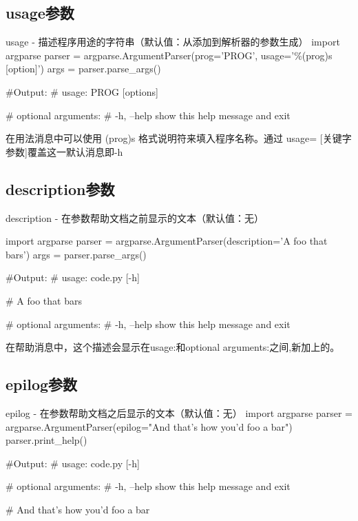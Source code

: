 \documentclass[11pt]{article}
\begin{document}
\subsection{usage参数} 	
 	\begin{Python}{usage - 描述程序用途的字符串（默认值：从添加到解析器的参数生成）}
import argparse
parser = argparse.ArgumentParser(prog='PROG', usage='\%(prog)s [option]')
args = parser.parse_args()
 		
#Output:   
#		 usage: PROG [options] 

#        optional arguments:
#          -h, --help  show this help message and exit
 	\end{Python}
 	在用法消息中可以使用 (prog)s 格式说明符来填入程序名称。通过 usage= [关键字参数]覆盖这一默认消息即-h
 
\subsection{description参数}	 
 	\begin{Python}{description - 在参数帮助文档之前显示的文本（默认值：无）}
 		
import argparse
parser = argparse.ArgumentParser(description='A foo that bars')
args = parser.parse_args()
 		
#Output:
#		usage: code.py [-h]

#       A foo that bars

#       optional arguments:
#         -h, --help  show this help message and exit
 		
 	\end{Python}
 	在帮助消息中，这个描述会显示在usage:和optional arguments:之间,新加上的。
 	
\subsection{epilog参数}
 	\begin{Python}{epilog - 在参数帮助文档之后显示的文本（默认值：无）}
import argparse
parser = argparse.ArgumentParser(epilog="And that's how you'd foo a bar")
parser.print_help()
 		
#Output:
#		usage: code.py [-h]

#       optional arguments:
#         -h, --help  show this help message and exit

#       And that's how you'd foo a bar
 	\end{Python}
 
\end{document}
